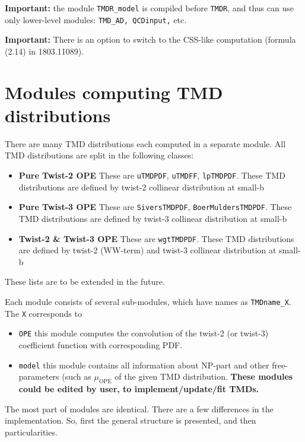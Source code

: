 \documentclass[prd,nofootinbib,eqsecnum,final]{revtex4}
\renewcommand{\(}{\left(}
\renewcommand{\)}{\right)}
\renewcommand{\[}{\left[}
\renewcommand{\]}{\right]}
\newcommand{\blue}[1]{{\color{blue} #1}}
\begin{document}
\vspace{2mm}

\textbf{Important:} the module \texttt{TMDR\_model} is compiled before \texttt{TMDR}, and thus can use only lower-level modules: \texttt{TMD\_AD, QCDinput,} etc.

\vspace{2mm}

\textbf{Important:} There is an option to switch to the CSS-like computation (formula (2.14) in 1803.11089).

\newpage

\section{Modules computing TMD distributions}

There are many TMD distributions each computed in a separate module. All TMD distributions are split in the following classes:
\begin{itemize}
\item \textbf{Pure Twist-2 OPE} These are \texttt{uTMDPDF}, \texttt{uTMDFF}, \texttt{lpTMDPDF}. These TMD distributions are defined by twist-2 collinear distribution at small-b
\item \textbf{Pure Twist-3 OPE} These are \texttt{SiversTMDPDF}, \texttt{BoerMuldersTMDPDF}. These TMD distributions are defined by twist-3 collinear distribution at small-b
\item \textbf{Twist-2 \& Twist-3 OPE} These are \texttt{wgtTMDPDF}. These TMD distributions are defined by twist-2 (WW-term) and twist-3 collinear distribution at small-b
\end{itemize}
These lists are to be extended in the future. 

Each module consists of several sub-modules, which have names as \texttt{TMDname\_X}. The \texttt{X} corresponds to
\begin{itemize}
\item  \texttt{OPE} this module computes the convolution of the twist-2 (or twist-3) coefficient function with corresponding PDF.
\item \texttt{model} this module contains all information about NP-part and other free-parameters (such as $\mu_{\text{OPE}}$ of the given TMD distribution. \textbf{\blue{These modules could be edited by user, to implement/update/fit TMDs.}}
\end{itemize}

The most part of modules are identical. There are a few differences in the implementation. So, first the general structure is presented, and then particularities.
\end{document}
